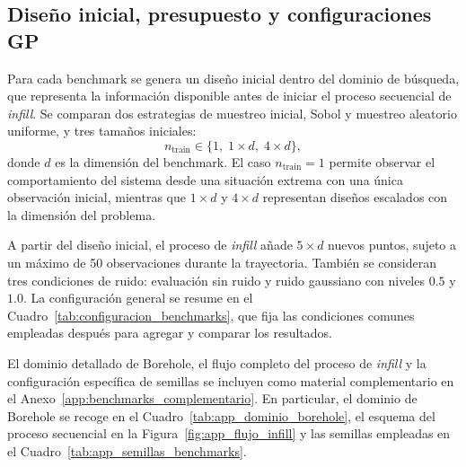 \subsection{Diseño inicial, presupuesto y configuraciones GP}
\label{subsec:diseno_inicial_presupuesto}

Para cada benchmark se genera un diseño inicial dentro del dominio de búsqueda, que representa la información disponible antes de iniciar el proceso secuencial de \emph{infill}. Se comparan dos estrategias de muestreo inicial, Sobol y muestreo aleatorio uniforme, y tres tamaños iniciales:
\[
    n_{\text{train}} \in \{1,\; 1 \times d,\; 4 \times d\},
\]
donde \(d\) es la dimensión del benchmark. El caso \(n_{\text{train}}=1\) permite observar el comportamiento del sistema desde una situación extrema con una única observación inicial, mientras que \(1 \times d\) y \(4 \times d\) representan diseños escalados con la dimensión del problema.

A partir del diseño inicial, el proceso de \emph{infill} añade \(5 \times d\) nuevos puntos, sujeto a un máximo de 50 observaciones durante la trayectoria. También se consideran tres condiciones de ruido: evaluación sin ruido y ruido gaussiano con niveles \(0.5\) y \(1.0\). La configuración general se resume en el Cuadro~\ref{tab:configuracion_benchmarks}, que fija las condiciones comunes empleadas después para agregar y comparar los resultados.

El dominio detallado de Borehole, el flujo completo del proceso de \emph{infill} y la configuración específica de semillas se incluyen como material complementario en el Anexo~\ref{app:benchmarks_complementario}. En particular, el dominio de Borehole se recoge en el Cuadro~\ref{tab:app_dominio_borehole}, el esquema del proceso secuencial en la Figura~\ref{fig:app_flujo_infill} y las semillas empleadas en el Cuadro~\ref{tab:app_semillas_benchmarks}.

